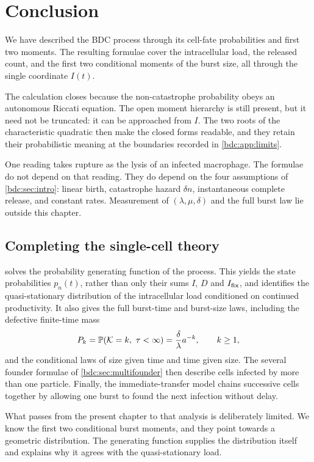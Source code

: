 \section{Conclusion}
\label{bdc:sec:next}

We have described the BDC process through its cell-fate probabilities and first
two moments. The resulting formulae cover the intracellular load, the released
count, and the first two conditional moments of the burst size, all through the
single coordinate $I(t)$.

The calculation closes because the non-catastrophe probability obeys an
autonomous Riccati equation. The open moment hierarchy is still present, but it
need not be truncated: it can be approached from $I$. The two roots of the
characteristic quadratic then make the closed forms readable, and they retain
their probabilistic meaning at the boundaries recorded in
\cref{bdc:app:limits}.

One reading takes rupture as the lysis of an infected macrophage. The formulae
do not depend on that reading. They do depend on the four assumptions of
\cref{bdc:sec:intro}: linear birth, catastrophe hazard $\delta n$,
instantaneous complete release, and constant rates. Measurement of
$(\lambda,\mu,\delta)$ and the full burst law lie outside this chapter.

\subsection{Completing the single-cell theory}
\label{bdc:sec:next-singlecell}

 solves the probability generating function of the
process. This yields the state probabilities $p_n(t)$, rather than only their
sums $I$, $D$ and $I_{\mathrm{fix}}$, and identifies the quasi-stationary distribution of
the intracellular load conditioned on continued productivity. It also gives the
full burst-time and burst-size laws, including the defective finite-time mass
\[
P_k=\mathbb{P}\!\left(\mathcal{K}=k,\ \tau<\infty\right)
=\frac{\delta}{\lambda}a^{-k},
\qquad k\ge1,
\]
and the conditional laws of size given time and time given size. The several
founder formulae of \cref{bdc:sec:multifounder} then describe cells infected by
more than one particle. Finally, the immediate-transfer model chains successive
cells together by allowing one burst to found the next infection without delay.

What passes from the present chapter to that analysis is deliberately limited.
We know the first two conditional burst moments, and they point towards a
geometric distribution. The generating function supplies the distribution
itself and explains why it agrees with the quasi-stationary load.

